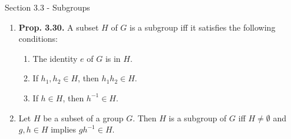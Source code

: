 \documentclass[12pt]{article}
\theoremstyle{definition}
\theoremstyle{named}
\begin{document}
\begin{section}{Section 3.3 - Subgroups}
    \begin{enumerate}
        \item \textbf{Prop. 3.30. } A subset $H$ of $G$ is a subgroup iff it satisfies the following conditions: 
        \begin{enumerate}
            \item The identity $e$ of $G$ is in $H$. 
            \item If $h_1,h_2 \in H$, then $h_1h_2 \in H$. 
            \item If $h \in H$, then $h^{-1} \in H$. 
        \end{enumerate}
        \item Let $H$ be a subset of a group $G$. Then $H$ is a subgroup of $G$ iff $H \neq \emptyset$ and $g,h \in H$ implies $gh^{-1} \in H$. 
    \end{enumerate}
\end{section}
\end{document}
